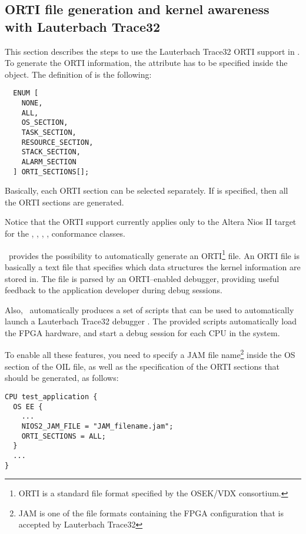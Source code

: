 \subsection{ORTI file generation and kernel awareness with Lauterbach Trace32}
\label{sub:orti}

This section describes the steps to use the Lauterbach Trace32 ORTI
support in \ee. To generate the ORTI information, the
 attribute has to be specified inside the
 object. The definition of  is the following:

\begin{lstlisting}
  ENUM [
    NONE,
    ALL,
    OS_SECTION,
    TASK_SECTION,
    RESOURCE_SECTION,
    STACK_SECTION,
    ALARM_SECTION
  ] ORTI_SECTIONS[];
\end{lstlisting}

Basically, each ORTI section can be selected separately. If
 is specified, then all the ORTI sections are generated.

Notice that the ORTI support currently applies only to the Altera Nios
II target for the , , ,
,  conformance classes.

\rtd\ provides the possibility to automatically generate an
ORTI\footnote{ORTI is a standard file format specified by the OSEK/VDX
consortium.} file.  An ORTI file is basically a text file that
specifies which data structures the kernel information are stored
in. The file is parsed by an ORTI--enabled debugger, providing useful
feedback to the application developer during debug sessions.

Also, \rtd\ automatically produces a set of scripts that can be used
to automatically launch a Lauterbach Trace32 debugger
\cite{Lauterbach}. The provided scripts automatically load the FPGA
hardware, and start a debug session for each CPU in the system.

To enable all these features, you need to specify a JAM file
name\footnote{JAM is one of the file formats containing the FPGA
configuration that is accepted by Lauterbach Trace32} inside the OS
section of the OIL file, as well as the specification of the ORTI
sections that should be generated, as follows:

\begin{lstlisting}
CPU test_application {
  OS EE {
    ...
    NIOS2_JAM_FILE = "JAM_filename.jam";
    ORTI_SECTIONS = ALL;
  }
  ...
}
\end{lstlisting}

